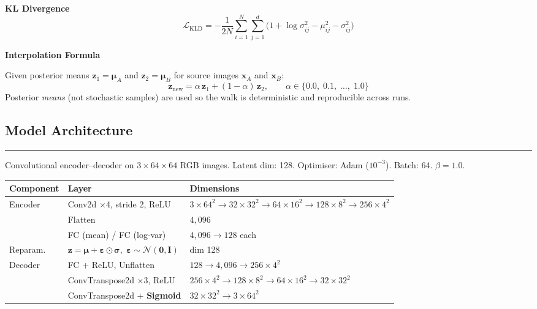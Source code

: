 \documentclass[11pt,a4paper]{article}
\begin{document}
\textbf{KL Divergence}
\[
    \mathcal{L}_{\text{KLD}}
    = -\frac{1}{2N}\sum_{i=1}^{N}\sum_{j=1}^{d}
      \bigl(1 + \log\sigma_{ij}^{2} - \mu_{ij}^{2} - \sigma_{ij}^{2}\bigr)
\]

\textbf{Interpolation Formula}

Given posterior means $\mathbf{z}_1 = \boldsymbol{\mu}_A$ and $\mathbf{z}_2 = \boldsymbol{\mu}_B$
for source images $\mathbf{x}_A$ and $\mathbf{x}_B$:
\[
    \mathbf{z}_{\text{new}} = \alpha\,\mathbf{z}_1 + (1-\alpha)\,\mathbf{z}_2,
    \qquad \alpha \in \{0.0,\;0.1,\;\ldots,\;1.0\}
\]
Posterior \emph{means} (not stochastic samples) are used so the walk is deterministic and reproducible across runs.

\subsection*{Model Architecture}
\noindent\rule{\linewidth}{0.4pt}

Convolutional encoder--decoder on $3\times64\times64$ RGB images.
Latent dim: 128. Optimiser: Adam ($10^{-3}$). Batch: 64. $\beta = 1.0$.

\begin{center}
\begin{tabular}{lll}
\toprule
\textbf{Component} & \textbf{Layer} & \textbf{Dimensions} \\
\midrule
Encoder   & Conv2d $\times$4, stride 2, ReLU      & $3\!\times\!64^2 \to 32\!\times\!32^2 \to 64\!\times\!16^2 \to 128\!\times\!8^2 \to 256\!\times\!4^2$ \\
          & Flatten                               & $4{,}096$ \\
          & FC (mean) / FC (log-var)              & $4{,}096 \to 128$ each \\
Reparam.  & $\mathbf{z}=\boldsymbol{\mu}+\boldsymbol{\varepsilon}\odot\boldsymbol{\sigma},\;\boldsymbol{\varepsilon}\sim\mathcal{N}(\mathbf{0},\mathbf{I})$ & dim 128 \\
Decoder   & FC + ReLU, Unflatten                  & $128 \to 4{,}096 \to 256\!\times\!4^2$ \\
          & ConvTranspose2d $\times$3, ReLU        & $256\!\times\!4^2 \to 128\!\times\!8^2 \to 64\!\times\!16^2 \to 32\!\times\!32^2$ \\
          & ConvTranspose2d + \textbf{Sigmoid}    & $32\!\times\!32^2 \to 3\!\times\!64^2$ \\
\bottomrule
\end{tabular}
\end{center}
\end{document}
